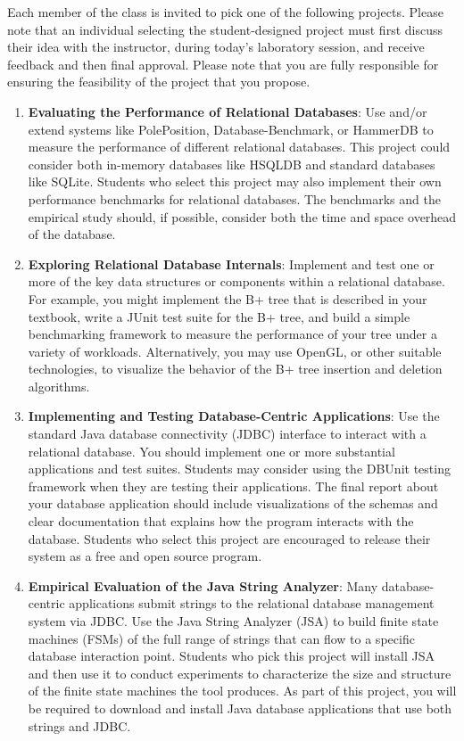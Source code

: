Each member of the class is invited to pick one of the following projects.  Please note that an individual selecting the
student-designed project must first discuss their idea with the instructor, during today's laboratory session, and
receive feedback and then final approval.  Please note that you are fully responsible for ensuring the feasibility of
the project that you propose.

\begin{enumerate}

  \item {\bf Evaluating the Performance of Relational Databases}: Use and/or extend systems like PolePosition,
    Database-Benchmark, or HammerDB to measure the performance of different relational databases.  This project could
    consider both in-memory databases like HSQLDB and standard databases like SQLite.  Students who select this project
    may also implement their own performance benchmarks for relational databases.  The benchmarks and
    the empirical study should, if possible, consider both the time and space overhead of the database.

  \item {\bf Exploring Relational Database Internals}: Implement and test one or more of the key data structures or
    components within a relational database.  For example, you might implement the B+ tree that is described in your
    textbook, write a JUnit test suite for the B+ tree, and build a simple benchmarking framework to measure the
    performance of your tree under a variety of workloads.  Alternatively, you may use OpenGL, or other suitable
    technologies, to visualize the behavior of the B+ tree insertion and deletion algorithms.

  \item {\bf Implementing and Testing Database-Centric Applications}: Use the standard Java database connectivity (JDBC)
    interface to interact with a relational database.  You should implement one or more substantial applications and
    test suites.  Students may consider using the DBUnit testing framework when they are testing their applications.
    The final report about your database application should include visualizations of the schemas and clear
    documentation that explains how the program interacts with the database.  Students who select this project are
    encouraged to release their system as a free and open source program.  

  \item {\bf Empirical Evaluation of the Java String Analyzer}: Many database-centric applications submit strings to the
    relational database management system via JDBC.  Use the Java String Analyzer (JSA) to build finite state machines
    (FSMs) of the full range of strings that can flow to a specific database interaction point.  Students who pick this
    project will install JSA and then use it to conduct experiments to characterize the size and structure of the finite
    state machines the tool produces.  As part of this project, you will be required to download and install Java
    database applications that use both strings and JDBC.  


\end{enumerate}
